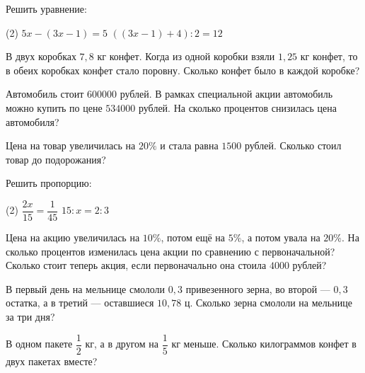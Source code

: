 \begin{homework}[number=1]
	\begin{listofex}
		\item Решить уравнение:
		\begin{tasks}(2)
			\task \( 5x-(3x-1)=5 \)
			\task \( ((3x-1)+4):2=12\)
		\end{tasks}
		\item В двух коробках \(7,8\) кг конфет.
		Когда из одной коробки взяли \(1,25\) кг конфет, то в обеих коробках конфет стало поровну.
		Сколько конфет было в каждой коробке?
		\item Автомобиль стоит \(600000\) рублей.
		В рамках специальной акции автомобиль можно купить по цене \(534000\) рублей.
		На сколько процентов снизилась цена автомобиля?
		\item Цена на товар увеличилась на \(20\%\) и стала равна \(1500\) рублей.
		Сколько стоил товар до подорожания?
	\end{listofex}
\end{homework}

\begin{homework}[number=2]
	\begin{listofex}
		\item Решить пропорцию:
		\begin{tasks}(2)
			\task \( \dfrac{2x}{15}=\dfrac{1}{45} \)
			\task \( 15:x=2:3\)
		\end{tasks}
		\item Цена на акцию увеличилась на \(10\%\), потом ещё на \(5\%\), а потом увала на \(20\%\). На сколько процентов изменилась цена акции по сравнению с первоначальной? Сколько стоит теперь акция, если первоначально она стоила \(4000\) рублей?
		\item В первый день на мельнице смололи \(0,3\) привезенного зерна, во второй --- \(0,3\) остатка, а в третий --- оставшиеся \(10,78\) ц. Сколько зерна смололи на мельнице за три дня?
		\item В одном пакете \( \dfrac{1}{2} \) кг, а в другом на \(\dfrac{1}{5}\) кг меньше.
		Сколько килограммов конфет в двух пакетах вместе?
	\end{listofex}
\end{homework}

